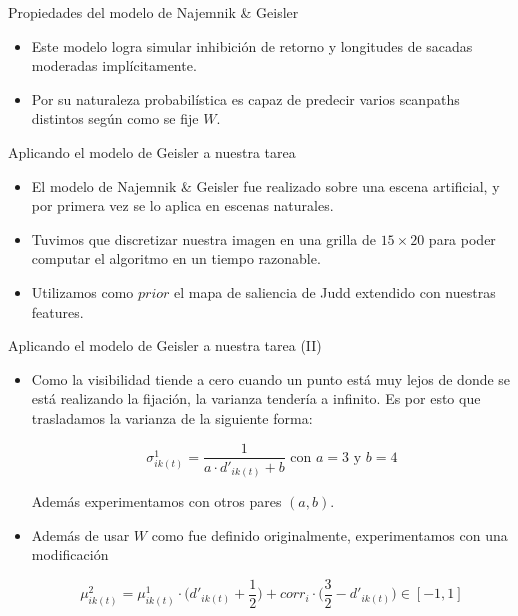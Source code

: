 \documentclass[compress]{beamer}
\begin{document}
\begin{frame}{Propiedades del modelo de Najemnik \& Geisler}
\begin{itemize}
\item Este modelo logra simular inhibición de retorno y longitudes de sacadas moderadas implícitamente. 
\item Por su naturaleza probabilística es capaz de predecir varios scanpaths distintos según como se fije $W$.
\end{itemize}
\end{frame}

\begin{frame}{Aplicando el modelo de Geisler a nuestra tarea}
\begin{itemize}
\item El modelo de Najemnik \& Geisler fue realizado sobre una escena artificial, y por primera vez se lo aplica en escenas naturales. 
\item Tuvimos que discretizar nuestra imagen en una grilla de $15 \times 20$ para poder computar el algoritmo en un tiempo razonable.
\item Utilizamos como $prior$ el mapa de saliencia de Judd extendido con nuestras features.
\end{itemize}
\end{frame}

\begin{frame}{Aplicando el modelo de Geisler a nuestra tarea (II)}
\begin{itemize}
\item Como la visibilidad tiende a cero cuando un punto está muy lejos de donde se está realizando la fijación, la varianza tendería a infinito. Es por esto que trasladamos la varianza de la siguiente forma:

$$ \sigma_{ik(t)}^1 = \displaystyle\frac{1}{a \cdot d'_{ik(t)} + b} \text{ con } a = 3 \text{ y } b = 4$$ 

Además experimentamos con otros pares $(a,b)$.
\item Además de usar $W$ como fue definido originalmente, experimentamos con una modificación 

$$\mu_{ik(t)}^2 = \mu^1_{ik(t)} \cdot \Big(d'_{ik(t)} + \dfrac{1}{2}\Big) + corr_{i} \cdot \Big(\dfrac{3}{2} - d'_{ik(t)}\Big) \in [-1, 1]$$

\end{itemize}
\end{frame}
\end{document}
